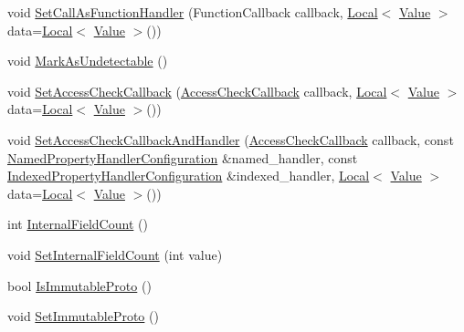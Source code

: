 \begin{DoxyCompactItemize}
\item 
void \mbox{\hyperlink{classv8_1_1ObjectTemplate_a1775c8f73e643c339804d2f5b628eddf}{Set\+Call\+As\+Function\+Handler}} (Function\+Callback callback, \mbox{\hyperlink{classv8_1_1Local}{Local}}$<$ \mbox{\hyperlink{classv8_1_1Value}{Value}} $>$ data=\mbox{\hyperlink{classv8_1_1Local}{Local}}$<$ \mbox{\hyperlink{classv8_1_1Value}{Value}} $>$())
\item 
void \mbox{\hyperlink{classv8_1_1ObjectTemplate_a7e40ef313b44c2ad336c73051523b4f8}{Mark\+As\+Undetectable}} ()
\item 
void \mbox{\hyperlink{classv8_1_1ObjectTemplate_a5b0337016cd89fc72f3a9d75399c2487}{Set\+Access\+Check\+Callback}} (\mbox{\hyperlink{namespacev8_a1024fb358d107c1494163217830688e6}{Access\+Check\+Callback}} callback, \mbox{\hyperlink{classv8_1_1Local}{Local}}$<$ \mbox{\hyperlink{classv8_1_1Value}{Value}} $>$ data=\mbox{\hyperlink{classv8_1_1Local}{Local}}$<$ \mbox{\hyperlink{classv8_1_1Value}{Value}} $>$())
\item 
void \mbox{\hyperlink{classv8_1_1ObjectTemplate_abb8302671bfb5d381f7415336f4e631d}{Set\+Access\+Check\+Callback\+And\+Handler}} (\mbox{\hyperlink{namespacev8_a1024fb358d107c1494163217830688e6}{Access\+Check\+Callback}} callback, const \mbox{\hyperlink{structv8_1_1NamedPropertyHandlerConfiguration}{Named\+Property\+Handler\+Configuration}} \&named\+\_\+handler, const \mbox{\hyperlink{structv8_1_1IndexedPropertyHandlerConfiguration}{Indexed\+Property\+Handler\+Configuration}} \&indexed\+\_\+handler, \mbox{\hyperlink{classv8_1_1Local}{Local}}$<$ \mbox{\hyperlink{classv8_1_1Value}{Value}} $>$ data=\mbox{\hyperlink{classv8_1_1Local}{Local}}$<$ \mbox{\hyperlink{classv8_1_1Value}{Value}} $>$())
\item 
int \mbox{\hyperlink{classv8_1_1ObjectTemplate_a43de785d594d8c01b18230b1aa79e31c}{Internal\+Field\+Count}} ()
\item 
void \mbox{\hyperlink{classv8_1_1ObjectTemplate_ab63916ac584a76bca8ba541f86ce9fce}{Set\+Internal\+Field\+Count}} (int value)
\item 
bool \mbox{\hyperlink{classv8_1_1ObjectTemplate_a76c12ee7be283bd3b007d062686dc0ed}{Is\+Immutable\+Proto}} ()
\item 
void \mbox{\hyperlink{classv8_1_1ObjectTemplate_adba49230a24b42f0985494ac86655e54}{Set\+Immutable\+Proto}} ()
\end{DoxyCompactItemize}

